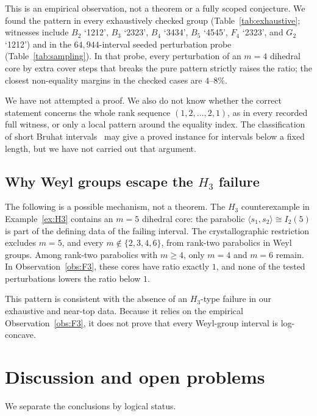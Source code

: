 \documentclass[11pt]{amsart}
\theoremstyle{plain}
\theoremstyle{definition}
\theoremstyle{remark}
\begin{document}
This is an empirical observation, not a theorem or a fully scoped
conjecture. We found the pattern in every exhaustively checked group
(Table~\ref{tab:exhaustive}; witnesses include $B_2$ `1212', $B_3$
`2323', $B_4$ `3434', $B_5$ `4545', $F_4$ `2323', and $G_2$ `1212') and
in the $64{,}944$-interval seeded perturbation probe
(Table~\ref{tab:sampling}). In that probe, every perturbation of an $m=4$
dihedral core by extra cover steps that breaks the pure pattern strictly
raises the ratio; the closest non-equality margins in the checked cases are
$4$--$8\%$.

We have not attempted a proof. We also do not know whether the correct
statement concerns the whole rank sequence $(1,2,\dots,2,1)$, as in every
recorded full witness, or only a local pattern around the equality index.
The classification of short Bruhat intervals~\cite{short-intervals} may
give a proved instance for intervals below a fixed length, but we have not
carried out that argument.

\subsection*{Why Weyl groups escape the $H_3$ failure}
The following is a possible mechanism, not a theorem. The $H_3$
counterexample in Example~\ref{ex:H3} contains an $m=5$ dihedral core: the
parabolic $\langle s_1,s_2\rangle\cong I_2(5)$ is part of the defining
data of the failing interval. The crystallographic restriction excludes
$m=5$, and every $m\notin\{2,3,4,6\}$, from rank-two parabolics in Weyl
groups. Among rank-two parabolics with $m\ge4$, only $m=4$ and $m=6$
remain. In Observation~\ref{obs:F3}, these cores have ratio exactly $1$,
and none of the tested perturbations lowers the ratio below $1$.

This pattern is consistent with the absence of an $H_3$-type failure in
our exhaustive and near-top data. Because it relies on the empirical
Observation~\ref{obs:F3}, it does not prove that every Weyl-group interval
is log-concave.

\section{Discussion and open problems}
\label{sec:discussion}

We separate the conclusions by logical status.
\end{document}
